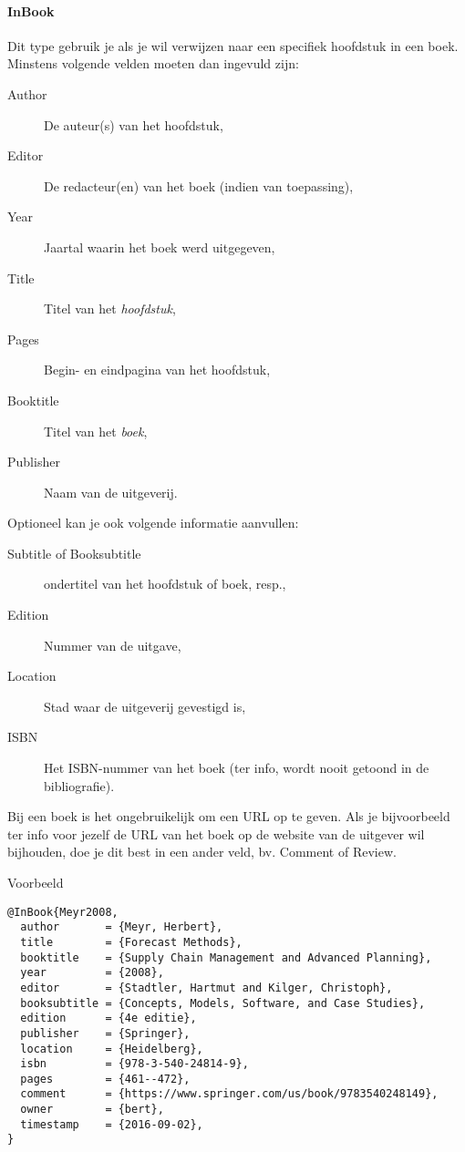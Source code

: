 \paragraph{InBook}

Dit type gebruik je als je wil verwijzen naar een specifiek hoofdstuk in een boek. Minstens volgende velden moeten dan ingevuld zijn:

\begin{description}
  \item[Author] De auteur(s) van het hoofdstuk,
  \item[Editor] De redacteur(en) van het boek (indien van toepassing),
  \item[Year] Jaartal waarin het boek werd uitgegeven,
  \item[Title] Titel van het \emph{hoofdstuk},
  \item[Pages] Begin- en eindpagina van het hoofdstuk,
  \item[Booktitle] Titel van het \emph{boek},
  \item[Publisher] Naam van de uitgeverij.
\end{description}

Optioneel kan je ook volgende informatie aanvullen:

\begin{description}
  \item[Subtitle of Booksubtitle] ondertitel van het hoofdstuk of boek, resp.,
  \item[Edition] Nummer van de uitgave,
  \item[Location] Stad waar de uitgeverij gevestigd is,
  \item[ISBN] Het ISBN-nummer van het boek (ter info, wordt nooit getoond in de bibliografie).
\end{description}

Bij een boek is het ongebruikelijk om een URL op te geven. Als je bijvoorbeeld ter info voor jezelf de URL van het boek op de website van de uitgever wil bijhouden, doe je dit best in een ander veld, bv. Comment of Review.

Voorbeeld
\begin{verbatim}
@InBook{Meyr2008,
  author       = {Meyr, Herbert},
  title        = {Forecast Methods},
  booktitle    = {Supply Chain Management and Advanced Planning},
  year         = {2008},
  editor       = {Stadtler, Hartmut and Kilger, Christoph},
  booksubtitle = {Concepts, Models, Software, and Case Studies},
  edition      = {4e editie},
  publisher    = {Springer},
  location     = {Heidelberg},
  isbn         = {978-3-540-24814-9},
  pages        = {461--472},
  comment      = {https://www.springer.com/us/book/9783540248149},
  owner        = {bert},
  timestamp    = {2016-09-02},
}
\end{verbatim}


